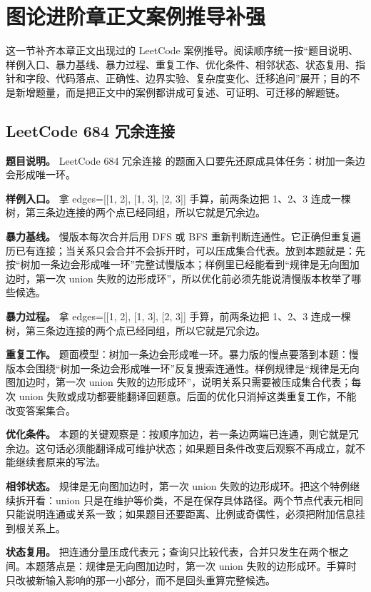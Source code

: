 \section{图论进阶章正文案例推导补强}

这一节补齐本章正文出现过的 LeetCode 案例推导。阅读顺序统一按“题目说明、样例入口、暴力基线、暴力过程、重复工作、优化条件、相邻状态、状态复用、指针和字段、代码落点、正确性、边界实验、复杂度变化、迁移追问”展开；目的不是新增题量，而是把正文中的案例都讲成可复述、可证明、可迁移的解题链。

\subsection{LeetCode 684 冗余连接}

\textbf{题目说明。} LeetCode 684 冗余连接 的题面入口要先还原成具体任务：树加一条边会形成唯一环。

\textbf{样例入口。} 拿 edges=[[1, 2], [1, 3], [2, 3]] 手算，前两条边把 1、2、3 连成一棵树，第三条边连接的两个点已经同组，所以它就是冗余边。

\textbf{暴力基线。} 慢版本每次合并后用 DFS 或 BFS 重新判断连通性。它正确但重复遍历已有连接；当关系只会合并不会拆开时，可以压成集合代表。放到本题就是：先按“树加一条边会形成唯一环”完整试慢版本；样例里已经能看到“规律是无向图加边时，第一次 union 失败的边形成环”，所以优化前必须先能说清慢版本枚举了哪些候选。

\textbf{暴力过程。} 拿 edges=[[1, 2], [1, 3], [2, 3]] 手算，前两条边把 1、2、3 连成一棵树，第三条边连接的两个点已经同组，所以它就是冗余边。

\textbf{重复工作。} 题面模型：树加一条边会形成唯一环。暴力版的慢点要落到本题：慢版本会围绕“树加一条边会形成唯一环”反复搜索连通性。样例规律是“规律是无向图加边时，第一次 union 失败的边形成环”，说明关系只需要被压成集合代表；每次 union 失败或成功都要能翻译回题意。后面的优化只消掉这类重复工作，不能改变答案集合。

\textbf{优化条件。} 本题的关键观察是：按顺序加边，若一条边两端已连通，则它就是冗余边。这句话必须能翻译成可维护状态；如果题目条件改变后观察不再成立，就不能继续套原来的写法。

\textbf{相邻状态。} 规律是无向图加边时，第一次 union 失败的边形成环。把这个特例继续拆开看：union 只是在维护等价类，不是在保存具体路径。两个节点代表元相同只能说明连通或关系一致；如果题目还要距离、比例或奇偶性，必须把附加信息挂到根关系上。

\textbf{状态复用。} 把连通分量压成代表元；查询只比较代表，合并只发生在两个根之间。本题落点是：规律是无向图加边时，第一次 union 失败的边形成环。手算时只改被新输入影响的那一小部分，而不是回头重算完整候选。

